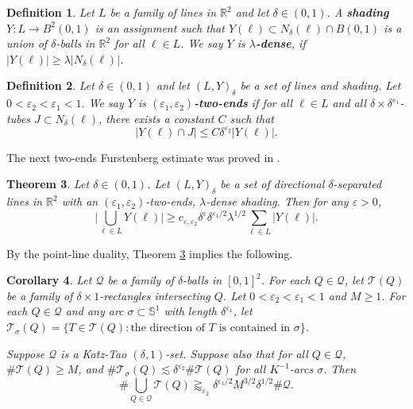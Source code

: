 \documentclass{amsart}
\numberwithin{equation}{section}
\newtheorem{theorem}{Theorem}[section]
\newtheorem{definition}[theorem]{Definition}
\newtheorem{corollary}[theorem]{Corollary}
\newcommand{\de}{\delta}
\newcommand{\e}{\varepsilon}
\newcommand{\la}{\lambda}
\newcommand{\si}{\sigma}
\newcommand{\cq}{\mathcal Q}
\newcommand{\ZR}{\mathbb{R}}
\newcommand{\ZS}{\mathbb{S}}
\newcommand{\cT}{{\mathcal T}}
\begin{document}
\smallskip


\begin{definition}
Let $L$ be a family of lines in $\ZR^2$ and let $\de\in(0,1)$.
A {\bf shading} $Y:L\to B^2(0,1)$ is an assignment such that $Y(\ell)\subset N_\de(\ell)\cap B(0,1)$ is a union of $\de$-balls in $\ZR^2$ for all $\ell\in L$.
We say $Y$ is {\bf $\la$-dense}, if $|Y(\ell)|\geq \la |N_\de(\ell)|$.
\end{definition}



\begin{definition}
Let $\de\in(0,1)$ and let $(L,Y)_\delta$ be a set of lines and shading.
Let $0<\e_2<\e_1<1$.
We say $Y$ is {\bf $(\e_1 ,\e_2)$-two-ends} if for all $\ell\in L$ and all $\de\times\de^{\e_1}$-tubes $J\subset N_\de(\ell)$, there exists a constant $C$ such that 
\begin{equation}
\nonumber
    |Y(\ell)\cap J|\leq C\de^{\e_2} |Y(\ell)|.
\end{equation}
\end{definition}


The next two-ends Furstenberg estimate was proved in \cite[Theorem 2.1]{Wang-Wu}.
\begin{theorem}
\label{two-ends-furstenberg}
Let $\de\in(0,1)$.
Let $(L,Y)_\de$ be a set of directional $\de$-separated lines in $\ZR^2$ with an $(\e_1, \e_2)$-two-ends, $\lambda$-dense shading. Then for any $\e>0$,
\begin{equation}
\label{eq:thm2.1}
    \Big|\bigcup_{\ell\in L}Y(\ell)\Big|\geq c_{\e,\e_2}\de^{\e}\de^{\e_1/2} \la^{1/2}\sum_{\ell\in L}|Y(\ell)|.
\end{equation}
\end{theorem}

By the point-line duality, Theorem \ref{two-ends-furstenberg} implies the following.
\begin{corollary}
\label{two-ends-furstenberg-cor}
Let $\cq$ be a family of $\de$-balls in $[0,1]^2$.
For each $Q\in\cq$, let $\cT(Q)$ be a family of $\de\times1$-rectangles intersecting $Q$.
Let $0<\e_2<\e_1<1$ and $M\geq1$.
For each $Q\in\cq$ and any arc $\si\subset\ZS^1$ with length $\de^{\e_1}$, let $\cT_\si(Q)=\{T\in\cT(Q): \text{the direction of $T$ is contained in $\si$}\}$.

Suppose $\cq$ is a Katz-Tao $(\de,1)$-set.
Suppose also that for all $Q\in\cq$, $\#\cT(Q)\geq M$, and $\#\cT_\si(Q)\lesssim \de^{\e_2}\#\cT(Q)$ for all $K^{-1}$-arcs $\si$.
Then
\begin{equation}
    \#\bigcup_{Q\in\cq}\cT(Q)\gtrapprox_{\e_2} \de^{\e_1/2} M^{3/2}\de^{1/2}\#\cq.
\end{equation}
\end{corollary}
\end{document}
